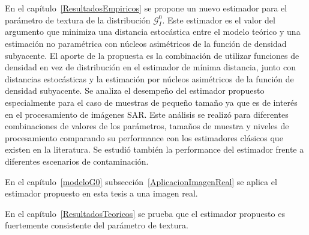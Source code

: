 En el capítulo~\ref{ResultadosEmpiricos} se propone un nuevo estimador para el parámetro de textura de la distribución $\mathcal{G}_I^0$. Este estimador es el valor del argumento que minimiza una distancia estocástica entre el modelo teórico y una estimación no paramétrica con núcleos asimétricos de la función de densidad subyacente. 
El aporte de la propuesta es la combinación de utilizar funciones de densidad en vez de distribución en el estimador de mínima distancia, junto con distancias estocásticas y la estimación por núcleos asimétricos de la función de densidad subyacente. Se analiza el desempeño del estimador propuesto especialmente para el caso de muestras de pequeño tamaño ya que es de interés en el procesamiento de imágenes SAR. Este análisis se realizó para diferentes combinaciones de valores de los parámetros, tamaños de muestra y niveles de procesamiento comparando su performance con los estimadores clásicos que existen en la literatura. Se estudió también la performance del estimador frente a diferentes escenarios de contaminación.

En el capítulo~\ref{modeloG0} subsección~\ref{AplicacionImagenReal} se aplica el estimador propuesto en esta tesis a una imagen real.

En el capítulo~\ref{ResultadosTeoricos} se prueba que el estimador propuesto es fuertemente consistente del parámetro de textura.
	